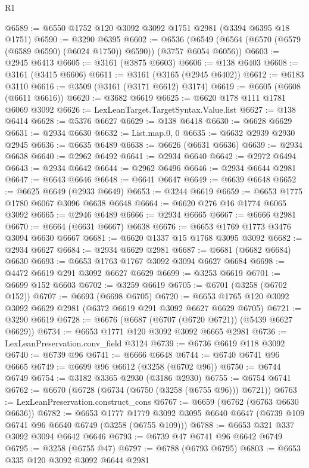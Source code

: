\begin{lexlean}{R1}
\begin{coremodule}
@6589 := @6550 @1752 @120 @3092 @3092 @1751 @2981 (@3394 @6395 @18 @1751)
@6590 := @3290 @6395
@6602 := @6536 (@6549 (@6564 (@6570 (@6579 (@6589 @6590) (@6024 @1750)) @6590)) (@3757 @6054 @6056))
@6603 := @2945 @6413
@6605 := @3161 (@3875 @6603)
@6606 := @138 @6403
@6608 := @3161 (@3415 @6606)
@6611 := @3161 (@3165 (@2945 @6402))
@6612 := @6183 @3110
@6616 := @3509 (@3161 (@3171 @6612) @3174)
@6619 := @6605 (@6608 (@6611 @6616))
@6620 := @3682 @6619
@6625 := @6620 @178 @111 @1781 @6069 @3092
@6626 := LexLeanTarget.TargetSyntax.Value.list
@6627 := @138 @6414
@6628 := @5376 @6627
@6629 := @138 @6418
@6630 := @6628 @6629
@6631 := @2934 @6630
@6632 := List.map.{0, 0}
@6635 := @6632 @2939 @2930 @2945
@6636 := @6635 @6489
@6638 := @6626 (@6631 @6636)
@6639 := @2934 @6638
@6640 := @2962 @6492
@6641 := @2934 @6640
@6642 := @2972 @6494
@6643 := @2934 @6642
@6644 := @2962 @6496
@6646 := @2934 @6644 @2981
@6647 := @6643 @6646
@6648 := @6641 @6647
@6649 := @6639 @6648
@6652 := @6625 @6649 (@2933 @6649)
@6653 := @3244 @6619
@6659 := @6653 @1775 @1780 @6067 @3096 @6638 @6648
@6664 := @6620 @276 @16 @1774 @6065 @3092
@6665 := @2946 @6489
@6666 := @2934 @6665
@6667 := @6666 @2981
@6670 := @6664 (@6631 @6667) @6638
@6676 := @6653 @1769 @1773 @3476 @3094 @6630 @6667
@6681 := @6620 @1337 @15 @1768 @3095 @3092
@6682 := @2934 @6627
@6684 := @2934 @6629 @2981
@6687 := @6681 (@6682 @6684) @6630
@6693 := @6653 @1763 @1767 @3092 @3094 @6627 @6684
@6698 := @4472 @6619 @291 @3092 @6627 @6629
@6699 := @3253 @6619
@6701 := @6699 @152 @6603
@6702 := @3259 @6619
@6705 := @6701 (@3258 (@6702 @152))
@6707 := @6693 (@6698 @6705)
@6720 := @6653 @1765 @120 @3092 @3092 @6629 @2981 (@6372 @6619 @291 @3092 @6627 @6629 @6705)
@6721 := @3290 @6619
@6728 := @6676 (@6687 (@6707 (@6720 @6721)) (@5439 @6627 @6629))
@6734 := @6653 @1771 @120 @3092 @3092 @6665 @2981
@6736 := LexLeanPreservation.conv_field @3124
@6739 := @6736 @6619 @118 @3092
@6740 := @6739 @96
@6741 := @6666 @6648
@6744 := @6740 @6741 @96 @6665
@6749 := @6699 @96 @6612 (@3258 (@6702 @96))
@6750 := @6744 @6749
@6754 := @3182 @3365 @2930 (@3186 @2930)
@6755 := @6754 @6741
@6762 := @6670 (@6728 (@6734 (@6750 (@3258 (@6755 @96))) @6721))
@6763 := LexLeanPreservation.construct_cons
@6767 := @6659 (@6762 (@6763 @6630 @6636))
@6782 := @6653
    @1777
    @1779
    @3092
    @3095
    @6640
    @6647
    (@6739 @109 @6741 @96 @6640 @6749 (@3258 (@6755 @109)))
@6788 := @6653 @321 @337 @3092 @3094 @6642 @6646
@6793 := @6739 @47 @6741 @96 @6642 @6749
@6795 := @3258 (@6755 @47)
@6797 := @6788 (@6793 @6795)
@6803 := @6653 @335 @120 @3092 @3092 @6644 @2981

\end{coremodule}
\end{lexlean}
